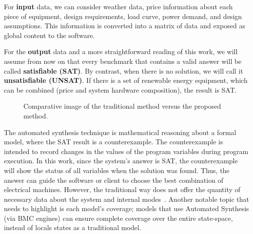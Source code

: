 \documentclass[journal]{IEEEtran}
\begin{document}
For \textbf{input} data, we can consider weather data, price information about each piece of equipment, design requirements, load curve, power demand, and design assumptions. This information is converted into a matrix of data and exposed as global content to the software.

For the \textbf{output} data and a more straightforward reading of this work, we will assume from now on that every benchmark that contains a valid answer will be called \textbf{satisfiable (SAT)}. By contrast, when there is no solution, we will call it \textbf{unsatisfiable (UNSAT)}. If there is a set of renewable energy equipment, which can be combined (price and system hardware composition), the result is SAT.
%
\begin{figure}[ht]
\begin{center}
\end{center}
\caption{Comparative image of the traditional method versus the proposed method.}
\label{fig:optimization}
\end{figure}
  
The automated synthesis technique is mathematical reasoning about a formal model, where the SAT result is a counterexample. The counterexample is intended to record changes in the values of the program variables during program execution. In this work, since the system's answer is SAT, the counterexample will show the status of all variables when the solution was found. Thus, the answer can guide the software or client to choose the best combination of electrical machines. However, the traditional way does not offer the quantity of necessary data about the system and internal modes~\cite{Benatiallah2017,Pradhan,Swarnkar}. Another notable topic that needs to highlight is each model's coverage; models that use Automated Synthesis (via BMC engines) can ensure complete coverage over the entire state-space, instead of locals states as a traditional model.
\end{document}
